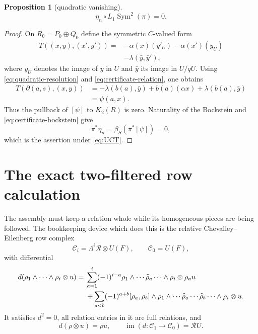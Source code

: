 \documentclass[11pt]{amsart}
\newtheorem{proposition}[theorem]{Proposition}
\theoremstyle{remark}
\newcommand{\Sym}{\operatorname{Sym}}
\newcommand{\Rel}{\mathcal R}
\begin{document}
\begin{proposition}[quadratic vanishing]\label{prop:quadratic-vanishing}
\[
                         \eta_n\circ L_1\Sym^2(\pi)=0.
\]
\end{proposition}

\begin{proof}
On $R_0=P_0\oplus Q_0$ define the symmetric $C$-valued form
\[
 \begin{split}
 T((x,y),(x',y'))={}&-\alpha(x)(y'_U)
                     -\alpha(x')(y_U)\\
                    &-\lambda(\bar y,\bar y'),
 \end{split}
\]
where $y_U$ denotes the image of $y$ in $U$ and $\bar y$ its image in
$U/qU$.  Using
\eqref{eq:quadratic-resolution} and
\eqref{eq:certificate-relation}, one obtains
\[
 \begin{aligned}
 T(\partial(a,s),(x,y))
 &=-\lambda(b(a),\bar y)+b(a)(\alpha x)
   +\lambda(b(a),\bar y)\\
 &=\psi(a,x).
 \end{aligned}
\]
Thus the pullback of $[\psi]$ to $K_2(R)$ is zero.  Naturality of the
Bockstein and \eqref{eq:certificate-bockstein} give
\[
 \pi^*\eta_n=\beta_S(\pi^*[\psi])=0,
\]
which is the assertion under \eqref{eq:UCT}.
\end{proof}


\section{The exact two-filtered row calculation}

The assembly must keep a relation whole while its homogeneous pieces are
being followed.  The bookkeeping device which does this is the relative
Chevalley--Eilenberg row complex
\begin{equation}\label{eq:CE-row-complex}
 \mathcal C_i=\Lambda^i\Rel\otimes U(F),\qquad
 \mathcal C_0=U(F),
\end{equation}
with differential
\begin{align}
 d(\rho_1\wedge\cdots\wedge\rho_i\otimes u)
={}&\sum_{a=1}^i(-1)^{i-a}
 \rho_1\wedge\cdots\widehat\rho_a\cdots\wedge\rho_i
 \otimes\rho_a u \notag\\
 &+\sum_{a<b}(-1)^{a+b}
 [\rho_a,\rho_b]\wedge
 \rho_1\wedge\cdots\widehat\rho_a\cdots
 \widehat\rho_b\cdots\wedge\rho_i\otimes u.
                                                        \label{eq:CE-differential}
\end{align}
It satisfies $d^2=0$, all relation entries in it are full relations, and
\begin{equation}\label{eq:CE-image}
 d(\rho\otimes u)=\rho u,\qquad
 \operatorname{im}(d:\mathcal C_1\to\mathcal C_0)=\Rel U.
\end{equation}
\end{document}
